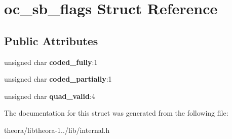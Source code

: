 \hypertarget{structoc__sb__flags}{\section{oc\+\_\+sb\+\_\+flags Struct Reference}
\label{structoc__sb__flags}
}
\subsection*{Public Attributes}
\begin{DoxyCompactItemize}
\item 
\hypertarget{structoc__sb__flags_a0026e465d0fa61c143e776cb3ef792d8}{unsigned char {\bfseries coded\+\_\+fully}\+:1}\label{structoc__sb__flags_a0026e465d0fa61c143e776cb3ef792d8}

\item 
\hypertarget{structoc__sb__flags_ae7e748ca7f24ea4f5078e46fe8d3f281}{unsigned char {\bfseries coded\+\_\+partially}\+:1}\label{structoc__sb__flags_ae7e748ca7f24ea4f5078e46fe8d3f281}

\item 
\hypertarget{structoc__sb__flags_ab7a574c6e0f280e573b308dedd8b0743}{unsigned char {\bfseries quad\+\_\+valid}\+:4}\label{structoc__sb__flags_ab7a574c6e0f280e573b308dedd8b0743}

\end{DoxyCompactItemize}


The documentation for this struct was generated from the following file\+:\begin{DoxyCompactItemize}
\item 
theora/libtheora-\/1../lib/internal.\+h\end{DoxyCompactItemize}
